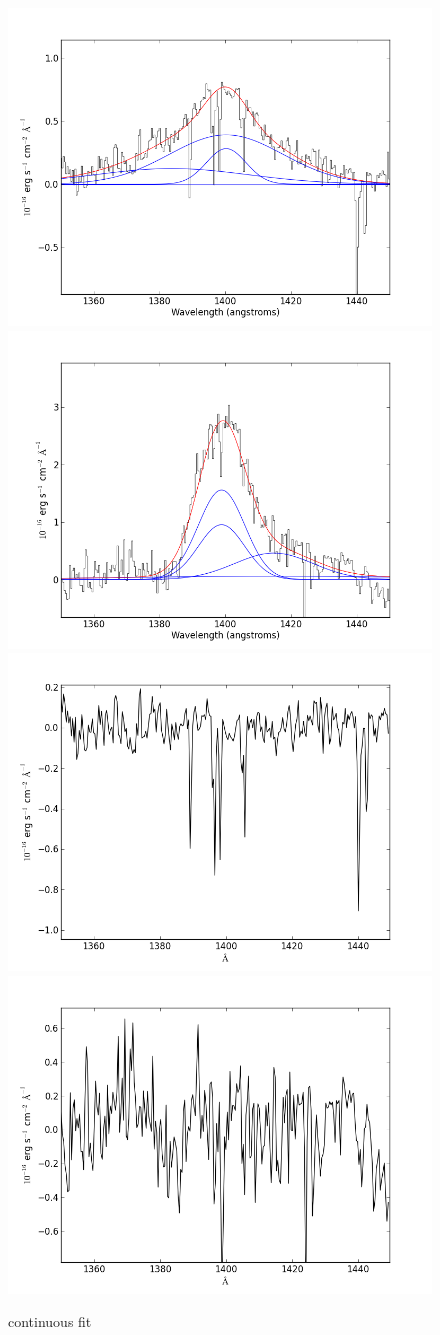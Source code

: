 \documentclass[usenatbib]{mn2e}
\begin{document}
\newpage

\begin{figure}
\begin{center}
\includegraphics[width=0.46\linewidth,angle=0]{SiIV_8.png}
\vspace{5mm}
\includegraphics[width=0.49\linewidth,angle=0]{SiIV_9.png}\\
\includegraphics[width=0.46\linewidth,angle=0]{SiIV_res_8.png}
\hspace{5mm}
\includegraphics[width=0.49\linewidth,angle=0]{SiIV_res_9.png}\\
\end{center} 
\caption{continuous fit \label{fig:landscape}}   
\end{figure}
\end{document}

